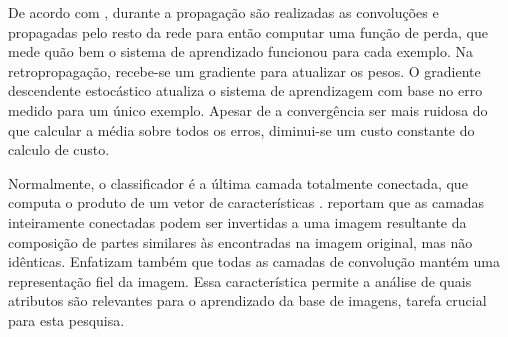 
De acordo com , durante a propagação são realizadas as convoluções e propagadas pelo resto da rede para então computar uma função de perda, que mede quão bem o sistema de aprendizado funcionou para cada exemplo. Na retropropagação, recebe-se um gradiente para atualizar os pesos. O gradiente descendente estocástico atualiza o sistema de aprendizagem com base no erro medido para um único exemplo. Apesar de a convergência ser mais ruidosa do que calcular a média sobre todos os erros, diminui-se um custo constante do calculo de custo.

Normalmente, o classificador é a última camada totalmente conectada, que computa o produto de um vetor de características \cite{Bengio-et-al-2014-Book}.  reportam que as camadas inteiramente conectadas podem ser invertidas a uma imagem resultante da composição de partes similares às encontradas na imagem original, mas não idênticas. Enfatizam também que todas as camadas de convolução mantém uma representação fiel da imagem. Essa característica permite a análise de quais atributos são relevantes para o aprendizado da base de imagens, tarefa crucial para esta pesquisa.


